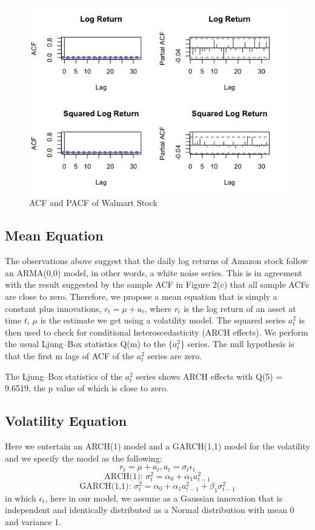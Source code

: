 \documentclass[paper=a4, fontsize=13pt]{article}
\begin{document}
\begin{figure}[!htbp]
\centering
\includegraphics[scale = 0.7]{img/cf_WMT}
\caption{ACF and PACF of Walmart Stock}
\label{cf_WMT}
\end{figure}

\subsection{Mean Equation}
The observations above suggest that the daily log returns of Amazon stock follow an ARMA(0,0) model, in other words, a white noise series. This is in agreement with the result suggested by the sample ACF in Figure 2(c) that all sample ACFs are close to zero. Therefore, we propose a mean equation that is simply a constant plus innovations, $r_t = \mu + a_t$, where $r_t$  is the log return of an asset at time $t$, $\mu$ is the estimate we get using a volatility model. The squared series $a_t^2$ is then used to check for conditional heteroscedasticity (ARCH effects). We perform the usual Ljung–Box statistics Q(m) to the $\{a_t^2\}$ series. The null hypothesis is that the first m lags of ACF of the $a_t^2$ series are zero.

The Ljung–Box statistics of the $a_t^2$ series shows ARCH effects with Q(5) = 9.6519, the p value of which is close to zero.

\subsection{Volatility Equation}
Here we entertain an ARCH(1) model and a GARCH(1,1) model for the volatility and we specify the model as the following:
\[ r_t = \mu+a_t, a_t = \sigma_t \epsilon_t \]
\[ \text{ARCH(1): } \sigma_t^2 = \alpha_0+\alpha_1 a_{t-1}^2 \]
\[ \text{GARCH(1,1): } \sigma_t^2= \alpha_0+\alpha_1 a_{t-1}^2+\beta_1 \sigma_{t-1}^2 \]
in which $\epsilon_t$, here in our model, we assume as a Gaussian innovation that is independent and identically distributed as a Normal distribution with mean 0 and variance 1.
\end{document}
